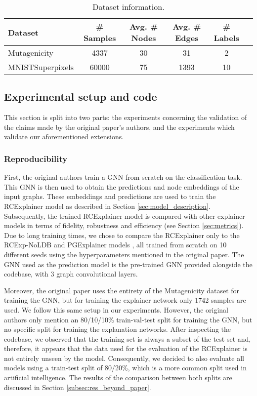\begin{table}[!htbp]
\caption{Dataset information.}
\centering
\begin{tabular}{lccccc}
\toprule
Dataset & \# Samples & Avg. \# Nodes & Avg. \# Edges & \# Labels \\
\midrule
Mutagenicity & 4337 & 30 & 31 & 2 \\
MNISTSuperpixels & 60000 & 75 & 1393 & 10 \\
\bottomrule
\end{tabular}
\label{table:datasets}
\end{table}

\subsection{Experimental setup and code}
This section is split into two parts: the experiments concerning the validation of the claims made by the original paper's authors, and the experiments which validate our aforementioned extensions.

\subsubsection{Reproducibility}
\label{subsec:reproducibility}
First, the original authors train a GNN from scratch on the classification task. This GNN is then used to obtain the predictions and node embeddings of the input graphs. These embeddings and predictions are used to train the RCExplainer model as described in Section \ref{sec:model_description}. Subsequently, the trained RCExplainer model is compared with other explainer models in terms of fidelity, robustness and efficiency (see Section \ref{sec:metrics}). Due to long training times, we chose to compare the RCExplainer only to the RCExp-NoLDB \cite{bajaj2021robust} and PGExplainer models \cite{luo2020parameterized}, all trained from scratch on 10 different seeds using the hyperparameters mentioned in the original paper. The GNN used as the prediction model is the pre-trained GNN provided alongside the codebase, with 3 graph convolutional layers.

Moreover, the original paper uses the entirety of the Mutagenicity dataset for training the GNN, but for training the explainer network only 1742 samples are used. We follow this same setup in our experiments. However, the original authors only mention an 80/10/10\% train-val-test split for training the GNN, but no specific split for training the explanation networks. After inspecting the codebase, we observed that the training set is always a subset of the test set and, therefore, it appears that the data used for the evaluation of the RCExplainer is not entirely unseen by the model. Consequently, we decided to also evaluate all models using a train-test split of 80/20\%, which is a more common split used in artificial intelligence. The results of the comparison between both splits are discussed in Section \ref{subsec:res_beyond_paper}.

